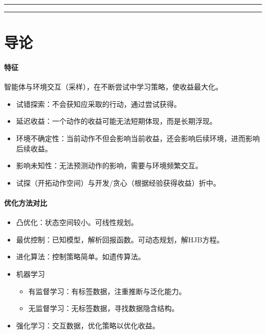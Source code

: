 \documentclass[
12pt, %
a4paper, 
oneside, %
headinclude,footinclude, %
]{scrartcl}
\title{\normalfont\spacedallcaps{强化学习}}
\date{}
\begin{document}
\maketitle
\newpage
\hypertarget{toc}{}
\begingroup
\begin{multicols}{2}
\tableofcontents
\end{multicols}
\endgroup
\newpage
\begingroup
\begin{multicols}{2}
\listoffigures
\end{multicols}
\endgroup
\hrule
\begingroup
\begin{multicols}{2}
\listoftables
\end{multicols}
\endgroup
\hrule
\begingroup
\begin{multicols}{2}
\listofalgorithms
\end{multicols}
\endgroup
\newpage
\listoftips
\newpage
\section{导论}
\paragraph{特征}
智能体与环境交互（采样），在不断尝试中学习策略，使收益最大化。
\begin{itemize}
\item 试错探索：不会获知应采取的行动，通过尝试获得。
\item 延迟收益：一个动作的收益可能无法短期体现，而是长期浮现。
\item 环境不确定性：当前动作不但会影响当前收益，还会影响后续环境，进而影响后续收益。
\item 影响未知性：无法预测动作的影响，需要与环境频繁交互。
\item 试探（开拓动作空间）与开发/贪心（根据经验获得收益）折中。
\end{itemize}
\paragraph{优化方法对比}
\begin{itemize}
\item 凸优化：状态空间较小。可线性规划。
\item 最优控制：已知模型，解析回报函数。可动态规划，解HJB方程。
\item 进化算法：控制策略简单。如遗传算法。
\item 机器学习
\begin{itemize}
\item 有监督学习：有标签数据，注重推断与泛化能力。
\item 无监督学习：无标签数据，寻找数据隐含结构。
\end{itemize}
\item 强化学习：交互数据，优化策略以优化收益。
\end{itemize}
\end{document}
